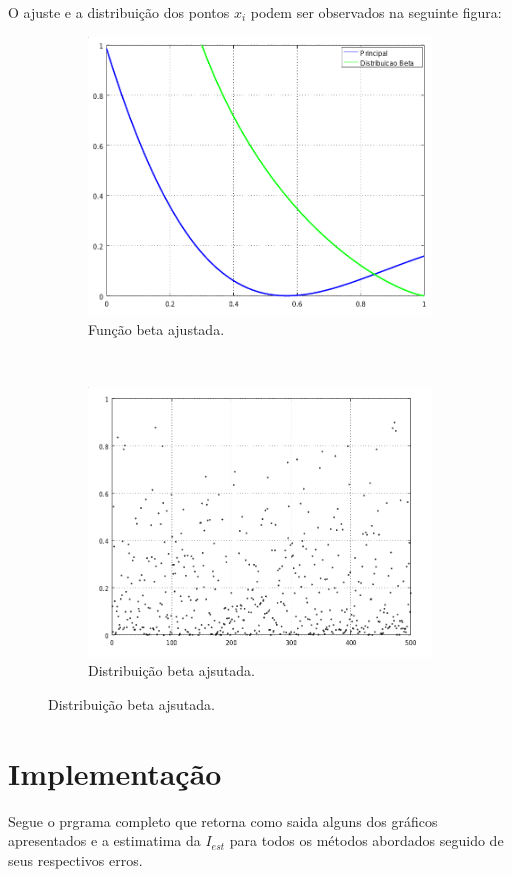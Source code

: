 \documentclass [a4paper,10pt]{article}
\begin{document}
    O ajuste e a distribuição dos pontos $x_i$ podem ser observados na seguinte figura:
	  \begin{figure}[!ht]
		\centering
		\begin{subfigure}[!hb]{0.5\textwidth}
		  \centering
		  \includegraphics[scale=0.31]{beta.png}
		  \caption{Função beta ajustada.\label{funcaobeta}}
		\end{subfigure}%
		~
		\begin{subfigure}[!hb]{0.5\textwidth}
		  \centering
		  \includegraphics[scale=0.31]{importance.png}
		  \caption{Distribuição beta ajsutada.\label{beta}}
		\end{subfigure}
	  \end{figure}
	  
	\section{Implementação}
	Segue o prgrama completo que retorna como saida alguns dos gráficos apresentados e a estimatima da $I_{est}$ para
	todos os métodos abordados seguido de seus respectivos erros.
	{\linespread{1.15}
    }
\end{document}
